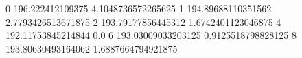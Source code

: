 0 196.222412109375 4.1048736572265625
1 194.89688110351562 2.7793426513671875
2 193.79177856445312 1.6742401123046875
4 192.11753845214844 0.0
6 193.03009033203125 0.9125518798828125
8 193.80630493164062 1.6887664794921875
